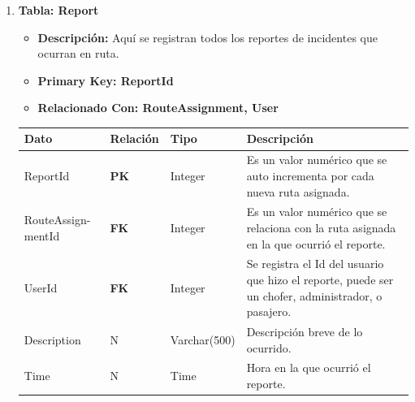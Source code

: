 \documentclass[12pt]{article}
\begin{document}
\begin{enumerate}
    \item \textbf{Tabla: Report}
    \begin{itemize}
        \item \textbf{Descripción:} Aquí se registran todos los reportes de incidentes que ocurran en ruta.
        \item \textbf{Primary Key: ReportId}
        \item \textbf{Relacionado Con: RouteAssignment, User}
    \end{itemize}
    \begin{table}[!h]
        \centering
        \begin{tabular}{|p{3cm}|p{2cm}|p{2.5cm}|p{8cm}|}
             \hline
             \textbf{Dato} & \textbf{Relación} & \textbf{Tipo} & \textbf{Descripción} \\
             \hline
             ReportId & \textbf{PK} & Integer & Es un valor numérico que se auto incrementa por cada nueva ruta asignada.\\
             \hline
             RouteAssign- mentId & \textbf{FK} & Integer & Es un valor numérico que se relaciona con la ruta asignada en la que ocurrió el reporte. \\
             \hline
             UserId & \textbf{FK} & Integer & Se registra el Id del usuario que hizo el reporte, puede ser un chofer, administrador, o pasajero.\\
             \hline
             Description & N & Varchar(500) & Descripción breve de lo ocurrido.\\
             \hline
             Time & N & Time & Hora en la que ocurrió el reporte.\\
             \hline
        \end{tabular}
    \end{table}


\end{enumerate}
\end{document}
